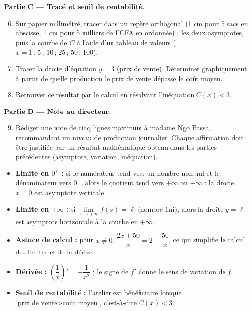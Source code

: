 \documentclass[11pt]{article}
\newcommand{\cle}[1]{{\popxbold\color{popdark}#1}}
\newcounter{popsec}
\newcounter{popsub}
\newcommand{\courssub}[1]{%
  \stepcounter{popsub}%
  \par\vspace{9pt}\noindent{\popxbold\fontsize{11.5}{13}\selectfont\color{popink}{\color{poporange}\thepopsec.\thepopsub}\hspace{6pt}#1}\par\nopagebreak\vspace{4pt}
}
\begin{document}
\textbf{Partie C — Tracé et seuil de rentabilité.}
\begin{enumerate}
\setcounter{enumi}{5}
\item Sur papier millimétré, tracer dans un repère orthogonal (1 cm pour 5 sacs en abscisse, 1 cm pour 5 milliers de FCFA en ordonnée) : les deux asymptotes, puis la courbe de $C$ à l'aide d'un tableau de valeurs ($x = 1\,;\,5\,;\,10\,;\,25\,;\,50\,;\,100$).
\item Tracer la droite d'équation $y = 3$ (prix de vente). Déterminer graphiquement à partir de quelle production le prix de vente dépasse le coût moyen.
\item Retrouver ce résultat par le calcul en résolvant l'inéquation $C(x) < 3$.
\end{enumerate}

\textbf{Partie D — Note au directeur.}
\begin{enumerate}
\setcounter{enumi}{8}
\item Rédiger une note de cinq lignes maximum à madame Ngo Bassa, recommandant un niveau de production journalier. Chaque affirmation doit être justifiée par un résultat mathématique obtenu dans les parties précédentes (asymptote, variation, inéquation).
\end{enumerate}

\courssub{Ressources à mobiliser}

\begin{aretenir}
\begin{itemize}
\item \textbf{Limite en $0^{+}$ :} si le numérateur tend vers un nombre non nul et le dénominateur vers $0^{+}$, alors le quotient tend vers $+\infty$ ou $-\infty$ : la droite $x = 0$ est \cle{asymptote verticale}.
\item \textbf{Limite en $+\infty$ :} si $\lim\limits_{x \to +\infty} f(x) = \ell$ (nombre fini), alors la droite $y = \ell$ est \cle{asymptote horizontale} à la courbe en $+\infty$.
\item \textbf{Astuce de calcul :} pour $x \neq 0$, $\dfrac{2x+50}{x} = 2 + \dfrac{50}{x}$, ce qui simplifie le calcul des limites et de la dérivée.
\item \textbf{Dérivée :} $\left(\dfrac{1}{x}\right)' = -\dfrac{1}{x^{2}}$ ; le signe de $f'$ donne le sens de variation de $f$.
\item \textbf{Seuil de rentabilité :} l'atelier est bénéficiaire lorsque $\text{prix de vente} > \text{coût moyen}$, c'est-à-dire $C(x) < 3$.
\end{itemize}
\end{aretenir}
\end{document}
